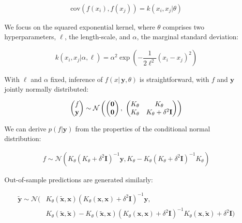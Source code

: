 \documentclass{article}
\newcommand{\lp}{\ensuremath{\left(}}
\newcommand{\rp}{\ensuremath{\right)}}
\begin{document}
\begin{align*}
  \text{cov}(f(x_i), f(x_j)) = k(x_i, x_j | \theta) 
\end{align*}

We focus on the squared exponential kernel, where $\theta$ comprises
two hyperparameters, $\ell$, the length-scale, and $\alpha$, the marginal
standard deviation:

\begin{align} \label{kern}
  k(x_i, x_j | \alpha, \ell) = \alpha^2 
\exp \left(
	- \dfrac{1}{2\ell^2} (x_{i} - x_{j})^2
\right)
\end{align}

With $\ell$ and $\alpha$ fixed, inference of $f(x | \, \mathbf{y}, \theta)$ is
straightforward, with $f$ and $\mathbf{y}$ jointly normally distributed:

\begin{align*} \begin{pmatrix} f\\ \mathbf{y} \\ \end{pmatrix} \sim
\mathcal{N} \lp \begin{pmatrix} \mathbf{0} \\ \mathbf{0} \end{pmatrix} ,\,\,
  \begin{pmatrix} K_\theta &
  K_\theta  \\ K_\theta &
  K_\theta + \delta ^ 2 \mathbf{I}\\ \end{pmatrix} \rp
\end{align*}

We can derive $p(f | \mathbf{y})$ from the properties of the conditional normal
distribution: 

\begin{align*}
  f \sim
  \mathcal{N}(K_\theta  (K_\theta + \delta ^ 2 \mathbf{I})^{-1}\mathbf{y},  
  K_\theta - K_\theta (K_\theta + \delta ^ 2 \mathbf{I})^{-1}K_\theta)
\end{align*}

Out-of-sample predictions are generated similarly:

\begin{align*} 
  \mathbf{\tilde{y}} \sim
  \mathcal{N}(&K_\theta(\mathbf{\tilde{x}},\mathbf{x}) (K_\theta(\mathbf{x},\mathbf{x}) +
  \delta ^ 2 \mathbf{I})^{-1}\mathbf{y},  
   \\ & K_\theta(\mathbf{\tilde{x}},\mathbf{\tilde{x}}) -K_\theta(\mathbf{\tilde{x}},\mathbf{x}) (K_\theta(\mathbf{x},\mathbf{x}) + \delta ^ 2 \mathbf{I})^{-1}K_\theta(\mathbf{x},\mathbf{\tilde{x}}) + \delta ^ 2 \mathbf{I})
\end{align*}
\end{document}
